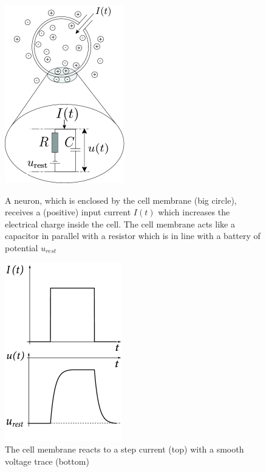 \documentclass[11pt]{article}
\begin{document}
\begin{figure}[H]
  \begin{minipage}{0.5\textwidth}
    \centering
    \includegraphics[width=0.6\linewidth]{image/x12.png}
    \caption{A neuron, which is enclosed by the cell membrane (big circle), receives a (positive) input current $I(t)$
      which increases the electrical charge inside the cell. The cell membrane acts like a capacitor in parallel with a resistor which is in line with a battery of potential $u_{rest}$\cite{gerstner2014neuronal}}
    \label{fig:neuron_real_circuit}
  \end{minipage}
  \hspace{0.5cm}
  \begin{minipage}{0.5\textwidth}
    \centering
    \includegraphics[width=0.6\linewidth]{image/x13.png}
    \caption{The cell membrane reacts to a step current (top) with a smooth voltage trace (bottom)\cite{gerstner2014neuronal}}
    \label{fig:neuron_real_circuit_trace}
  \end{minipage}
\end{figure}
\end{document}
